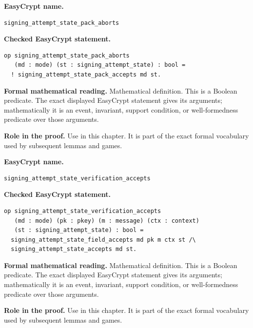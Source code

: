 \begin{formaldefinition}
\noindent\textbf{EasyCrypt name.}
\begin{lstlisting}[language=EasyCrypt,basicstyle=\ttfamily\scriptsize]
signing_attempt_state_pack_aborts
\end{lstlisting}
\noindent\textbf{Checked EasyCrypt statement.}
\begin{lstlisting}[language=EasyCrypt,basicstyle=\ttfamily\scriptsize]
op signing_attempt_state_pack_aborts
   (md : mode) (st : signing_attempt_state) : bool =
  ! signing_attempt_state_pack_accepts md st.
\end{lstlisting}
\noindent\textbf{Formal mathematical reading.}
Mathematical definition. This is a Boolean predicate.  The exact displayed EasyCrypt statement gives its arguments; mathematically it is an event, invariant, support condition, or well-formedness predicate over those arguments.

\noindent\textbf{Role in the proof.}
Use in this chapter. It is part of the exact formal vocabulary used by subsequent lemmas and games.

\end{formaldefinition}

\begin{formaldefinition}
\noindent\textbf{EasyCrypt name.}
\begin{lstlisting}[language=EasyCrypt,basicstyle=\ttfamily\scriptsize]
signing_attempt_state_verification_accepts
\end{lstlisting}
\noindent\textbf{Checked EasyCrypt statement.}
\begin{lstlisting}[language=EasyCrypt,basicstyle=\ttfamily\scriptsize]
op signing_attempt_state_verification_accepts
   (md : mode) (pk : pkey) (m : message) (ctx : context)
   (st : signing_attempt_state) : bool =
  signing_attempt_state_field_accepts md pk m ctx st /\
  signing_attempt_state_accepts md st.
\end{lstlisting}
\noindent\textbf{Formal mathematical reading.}
Mathematical definition. This is a Boolean predicate.  The exact displayed EasyCrypt statement gives its arguments; mathematically it is an event, invariant, support condition, or well-formedness predicate over those arguments.

\noindent\textbf{Role in the proof.}
Use in this chapter. It is part of the exact formal vocabulary used by subsequent lemmas and games.

\end{formaldefinition}

